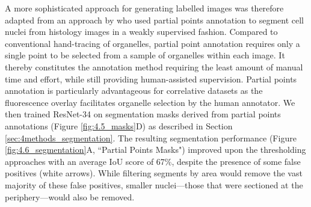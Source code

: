 A more sophisticated approach for generating labelled images was therefore adapted from an approach by \textcite{qu2020weakly} who used partial points annotation to segment cell nuclei from histology images in a weakly supervised fashion. Compared to conventional hand-tracing of organelles, partial point annotation requires only a single point to be selected from a sample of organelles within each image. It thereby constitutes the annotation method requiring the least amount of manual time and effort, while still providing human-assisted supervision. Partial points annotation is particularly advantageous for correlative datasets as the fluorescence overlay facilitates organelle selection by the human annotator. We then trained ResNet-34 on segmentation masks derived from partial points annotations (Figure \ref{fig:4.5_masks}D) as described in Section \ref{sec:4methods_segmentation}. The resulting segmentation performance (Figure \ref{fig:4.6_segmentation}A, ``Partial Points Masks") improved upon the thresholding approaches with an average IoU score of 67\%, despite the presence of some false positives (white arrows). While filtering segments by area would remove the vast majority of these false positives, smaller nuclei---those that were sectioned at the periphery---would also be removed.
